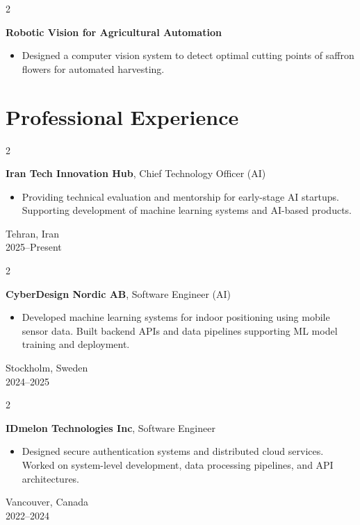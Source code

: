 \documentclass[10pt, letterpaper]{article}
\newenvironment{highlights}{
    \begin{itemize}[
        topsep=0.10 cm,
        parsep=0.10 cm,
        partopsep=0pt,
        itemsep=0pt,
        leftmargin=0.4 cm + 10pt
    ]
}{
    \end{itemize}
}
\newenvironment{twocolentry}[2][]{
    \onecolentry
    \def\secondColumn{#2}
    \setcolumnwidth{\fill, 4.5 cm}
    \begin{paracol}{2}
}{
    \switchcolumn \raggedleft \secondColumn
    \end{paracol}
    \endonecolentry
}
\begin{document}
    \begin{twocolentry}{2020}
        \textbf{Robotic Vision for Agricultural Automation}
        \begin{highlights}
            \item Designed a computer vision system to detect optimal cutting points of saffron flowers for automated harvesting.
        \end{highlights}
    \end{twocolentry}

    \section{Professional Experience}
    \begin{twocolentry}{Tehran, Iran \\ 2025--Present}
        \textbf{Iran Tech Innovation Hub}, Chief Technology Officer (AI)
        \begin{highlights}
            \item Providing technical evaluation and mentorship for early-stage AI startups. Supporting development of machine learning systems and AI-based products.
        \end{highlights}
    \end{twocolentry}

    \begin{twocolentry}{Stockholm, Sweden \\ 2024--2025}
        \textbf{CyberDesign Nordic AB}, Software Engineer (AI)
        \begin{highlights}
            \item Developed machine learning systems for indoor positioning using mobile sensor data. Built backend APIs and data pipelines supporting ML model training and deployment.
        \end{highlights}
    \end{twocolentry}

    \begin{twocolentry}{Vancouver, Canada \\ 2022--2024}
        \textbf{IDmelon Technologies Inc}, Software Engineer
        \begin{highlights}
            \item Designed secure authentication systems and distributed cloud services. Worked on system-level development, data processing pipelines, and API architectures.
        \end{highlights}
    \end{twocolentry}
\end{document}
